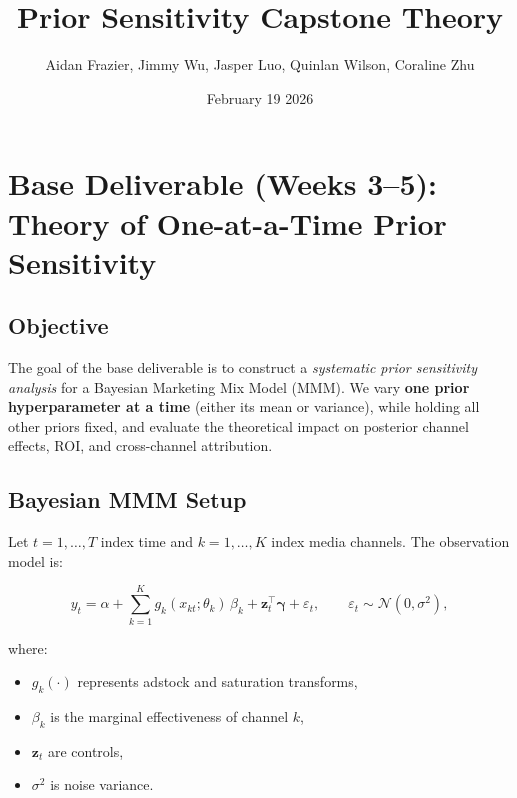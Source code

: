 \documentclass{article}
\title{Prior Sensitivity Capstone Theory}
\author{Aidan Frazier, Jimmy Wu, Jasper Luo, Quinlan Wilson, Coraline Zhu}
\date{February 19 2026}
\begin{document}
\maketitle

\section{Base Deliverable (Weeks 3--5): Theory of One-at-a-Time Prior Sensitivity}

\subsection{Objective}
The goal of the base deliverable is to construct a \emph{systematic prior sensitivity analysis}
for a Bayesian Marketing Mix Model (MMM). We vary \textbf{one prior hyperparameter at a time}
(either its mean or variance), while holding all other priors fixed, and evaluate the theoretical
impact on posterior channel effects, ROI, and cross-channel attribution.

\vspace{0.5em}

\subsection{Bayesian MMM Setup}

Let $t = 1,\dots,T$ index time and $k = 1,\dots,K$ index media channels.
The observation model is:

\begin{equation}
y_t = \alpha + \sum_{k=1}^{K} g_k(x_{kt};\theta_k)\,\beta_k + \mathbf{z}_t^\top \boldsymbol{\gamma} + \varepsilon_t,
\qquad
\varepsilon_t \sim \mathcal{N}(0,\sigma^2),
\end{equation}

where:
\begin{itemize}
\item $g_k(\cdot)$ represents adstock and saturation transforms,
\item $\beta_k$ is the marginal effectiveness of channel $k$,
\item $\mathbf{z}_t$ are controls,
\item $\sigma^2$ is noise variance.
\end{itemize}
\end{document}
